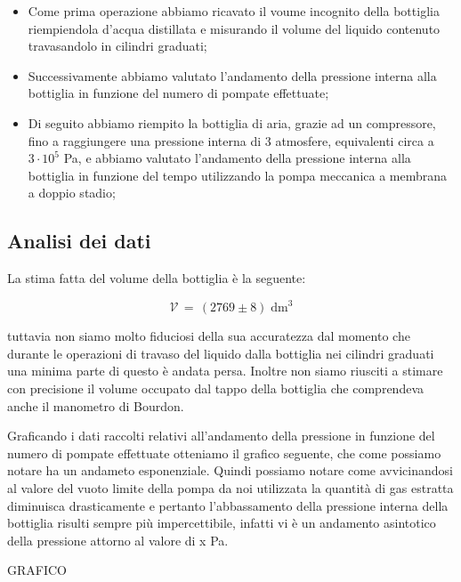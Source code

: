\begin{itemize}
	\item{Come prima operazione abbiamo ricavato il voume incognito della bottiglia riempiendola d'acqua distillata e misurando il volume del liquido contenuto travasandolo in cilindri graduati;}
	\item{Successivamente abbiamo valutato l'andamento della pressione interna alla bottiglia in funzione del numero di pompate effettuate;}
	\item{Di seguito abbiamo riempito la bottiglia di aria, grazie ad un compressore, fino a raggiungere una pressione interna di 3 atmosfere, equivalenti circa a $3 \cdot 10^5$ \si{\pascal}, e abbiamo valutato l'andamento della pressione interna alla bottiglia in funzione del tempo utilizzando la pompa meccanica a membrana a doppio stadio;}
\end{itemize}

\subsection{Analisi dei dati}

La stima fatta del volume della bottiglia è la seguente:

\begin{equation}
	\mathcal{V} \, = \, (2769 \pm 8) \; \si{\deci\meter}^3  
\end{equation}

tuttavia non siamo molto fiduciosi della sua accuratezza dal momento che durante le operazioni di travaso del liquido dalla bottiglia nei cilindri graduati una minima parte di questo è andata persa. Inoltre non siamo riusciti a stimare con precisione il volume occupato dal tappo della bottiglia che comprendeva anche il manometro di Bourdon.

Graficando i dati raccolti relativi all'andamento della pressione in funzione del numero di pompate effettuate otteniamo il grafico seguente, che come possiamo notare ha un andameto esponenziale. Quindi possiamo notare come avvicinandosi al valore del vuoto limite della pompa da noi utilizzata la quantità di gas estratta diminuisca drasticamente e pertanto l'abbassamento della pressione interna della bottiglia risulti sempre più impercettibile, infatti vi è un andamento asintotico della pressione attorno al valore di x Pa.

GRAFICO


